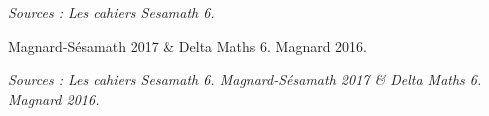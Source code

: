 \begin{colonne*exercice}    %
    
    
        
        
    
    \columnbreak
    
        
    
            
        

    {\it\footnotesize Sources : Les cahiers Sesamath 6. \par Magnard-Sésamath 2017 \& Delta Maths 6. Magnard 2016.}
\end{colonne*exercice}        %
    

    {\it\footnotesize Sources : Les cahiers Sesamath 6. Magnard-Sésamath 2017 \& Delta Maths 6. Magnard 2016.}
    


